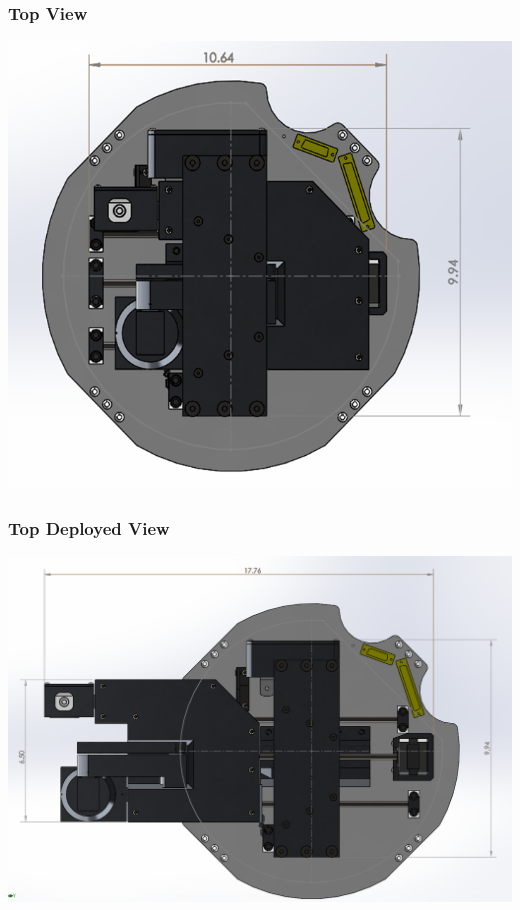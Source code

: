 \subsubsection{Top View}
\includegraphics[width=\textwidth]{./images/CAD/TOP}
\subsubsection{Top Deployed View}
\includegraphics[width=\textwidth]{./images/CAD/TOP_DEPLOYED}
